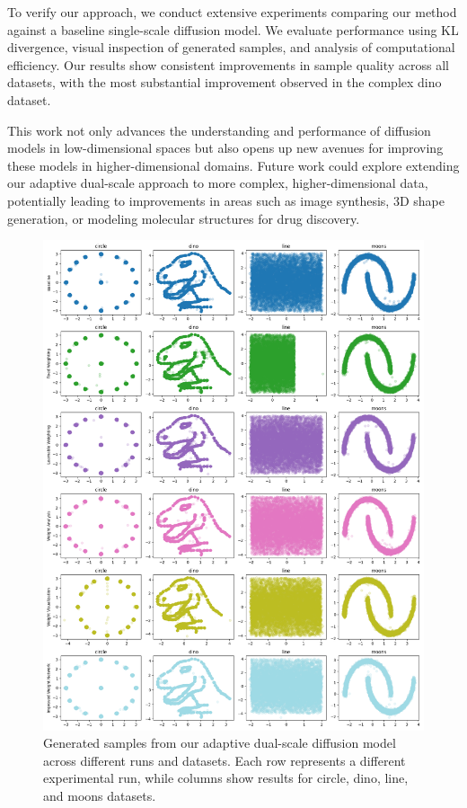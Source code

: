 \documentclass{article} %
\begin{document}
To verify our approach, we conduct extensive experiments comparing our method against a baseline single-scale diffusion model. We evaluate performance using KL divergence, visual inspection of generated samples, and analysis of computational efficiency. Our results show consistent improvements in sample quality across all datasets, with the most substantial improvement observed in the complex dino dataset.

This work not only advances the understanding and performance of diffusion models in low-dimensional spaces but also opens up new avenues for improving these models in higher-dimensional domains. Future work could explore extending our adaptive dual-scale approach to more complex, higher-dimensional data, potentially leading to improvements in areas such as image synthesis, 3D shape generation, or modeling molecular structures for drug discovery.

\begin{figure}[t]
    \centering
    \includegraphics[width=\textwidth]{generated_images.png}
    \caption{Generated samples from our adaptive dual-scale diffusion model across different runs and datasets. Each row represents a different experimental run, while columns show results for circle, dino, line, and moons datasets.}
    \label{fig:generated_samples}
\end{figure}
\end{document}
